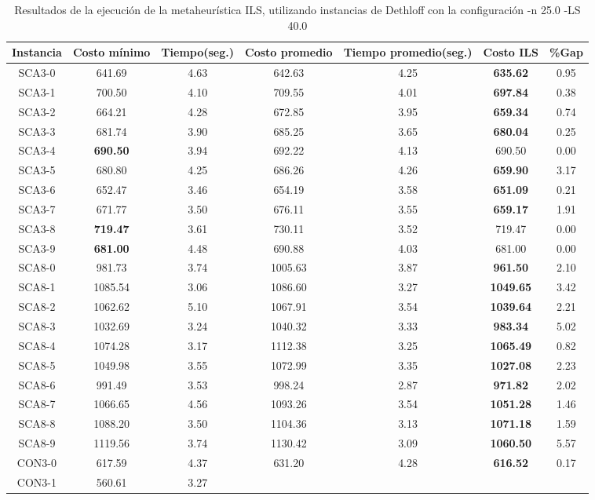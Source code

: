 \begin{table}[ht]
\caption{Resultados de la ejecución de la metaheurística ILS, utilizando instancias de Dethloff con la configuración -n 25.0 -LS 40.0}
\centering
\small
\begin{tabular}{c c c c c c c}
\hline\hline
Instancia & Costo mínimo & Tiempo(seg.) & Costo promedio & Tiempo promedio(seg.) & Costo ILS & \%Gap \\ [0.5ex]
\hline
SCA3-0 & 641.69 & 4.63 & 
642.63 & 4.25 & \bf{635.62} & 
0.95\\SCA3-1 & 700.50 & 4.10 & 
709.55 & 4.01 & \bf{697.84} & 
0.38\\SCA3-2 & 664.21 & 4.28 & 
672.85 & 3.95 & \bf{659.34} & 
0.74\\SCA3-3 & 681.74 & 3.90 & 
685.25 & 3.65 & \bf{680.04} & 
0.25\\SCA3-4 & \bf{690.50} & 3.94 & 
692.22 & 4.13 & 690.50 & 0.00\\
SCA3-5 & 680.80 & 4.25 & 
686.26 & 4.26 & \bf{659.90} & 
3.17\\SCA3-6 & 652.47 & 3.46 & 
654.19 & 3.58 & \bf{651.09} & 
0.21\\SCA3-7 & 671.77 & 3.50 & 
676.11 & 3.55 & \bf{659.17} & 
1.91\\SCA3-8 & \bf{719.47} & 3.61 & 
730.11 & 3.52 & 719.47 & 0.00\\
SCA3-9 & \bf{681.00} & 4.48 & 
690.88 & 4.03 & 681.00 & 0.00\\
SCA8-0 & 981.73 & 3.74 & 
1005.63 & 3.87 & \bf{961.50} & 
2.10\\SCA8-1 & 1085.54 & 3.06 & 
1086.60 & 3.27 & \bf{1049.65} & 
3.42\\SCA8-2 & 1062.62 & 5.10 & 
1067.91 & 3.54 & \bf{1039.64} & 
2.21\\SCA8-3 & 1032.69 & 3.24 & 
1040.32 & 3.33 & \bf{983.34} & 
5.02\\SCA8-4 & 1074.28 & 3.17 & 
1112.38 & 3.25 & \bf{1065.49} & 
0.82\\SCA8-5 & 1049.98 & 3.55 & 
1072.99 & 3.35 & \bf{1027.08} & 
2.23\\SCA8-6 & 991.49 & 3.53 & 
998.24 & 2.87 & \bf{971.82} & 
2.02\\SCA8-7 & 1066.65 & 4.56 & 
1093.26 & 3.54 & \bf{1051.28} & 
1.46\\SCA8-8 & 1088.20 & 3.50 & 
1104.36 & 3.13 & \bf{1071.18} & 
1.59\\SCA8-9 & 1119.56 & 3.74 & 
1130.42 & 3.09 & \bf{1060.50} & 
5.57\\CON3-0 & 617.59 & 4.37 & 
631.20 & 4.28 & \bf{616.52} & 
0.17\\CON3-1 & 560.61 & 3.27 & 

\end{tabular}
\end{table}
